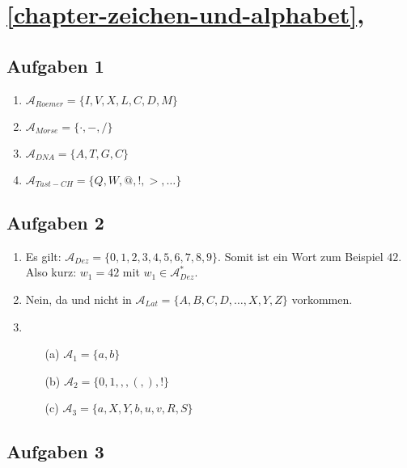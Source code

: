 \section{\autoref{chapter-zeichen-und-alphabet}, }

\subsection*{Aufgaben 1}

\begin{enumerate}
\item $\mathscr{A}_{Roemer} = \{I, V, X, L, C, D, M\}$
\item $\mathscr{A}_{Morse} = \{\cdot, -, /\}$
\item $\mathscr{A}_{DNA} = \{A, T, G, C\}$
\item $\mathscr{A}_{Tast-CH} = \{Q, W, @, !, >, \dots\}$
\end{enumerate}

\subsection*{Aufgaben 2}

\begin{enumerate}
\item Es gilt: $\mathscr{A}_{Dez} = \{0, 1, 2, 3, 4, 5, 6, 7, 8, 9\}$. Somit ist ein Wort zum Beispiel $42$. Also kurz: $w_1 = 42$ mit $w_1 \in \mathscr{A}_{Dez}^*$.
\item Nein, da  und  nicht in $\mathscr{A}_{Lat} = \{A, B, C, D, \dots , X, Y, Z\}$ vorkommen.
\item 
	\begin{enumerate}
	\item[(a)] $\mathscr{A}_{1}=\{a, b\}$
	\item[(b)] $\mathscr{A}_{2}=\{0, 1, , , (, ), !\}$
	\item[(c)] $\mathscr{A}_{3}=\{a, X, Y, b, u, v, R, S\}$
	\end{enumerate}
\end{enumerate}

\subsection*{Aufgaben 3}

